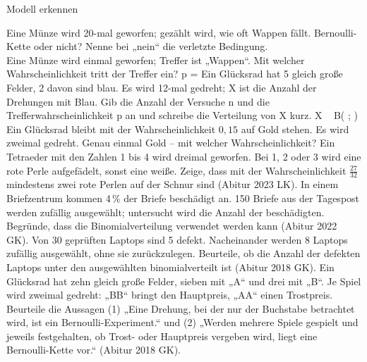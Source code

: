 \setcounter{aufgabe}{10}

\begin{aufgabe}{Modell erkennen}
\begin{teile}
\teil Eine Münze wird 20-mal geworfen; gezählt wird, wie oft Wappen fällt. Bernoulli-Kette oder nicht? Nenne bei „nein“ die verletzte Bedingung.  \\ 
\teil Eine Münze wird einmal geworfen; Treffer ist „Wappen“. Mit welcher Wahrscheinlichkeit tritt der Treffer ein? p = \leerfeld
\teil Ein Glücksrad hat 5 gleich große Felder, 2 davon sind blau. Es wird 12-mal gedreht; X ist die Anzahl der Drehungen mit Blau. Gib die Anzahl der Versuche n und die Trefferwahrscheinlichkeit p an und schreibe die Verteilung von X kurz. X ~ B( \leerfeld ; \leerfeld )
\teil Ein Glücksrad bleibt mit der Wahrscheinlichkeit $0{,}15$ auf Gold stehen. Es wird zweimal gedreht. Genau einmal Gold – mit welcher Wahrscheinlichkeit? \leerfeld
\teil Ein Tetraeder mit den Zahlen 1 bis 4 wird dreimal geworfen. Bei 1, 2 oder 3 wird eine rote Perle aufgefädelt, sonst eine weiße. Zeige, dass mit der Wahrscheinlichkeit $\frac{27}{32}$ mindestens zwei rote Perlen auf der Schnur sind \hfill (Abitur 2023 LK).
\teil In einem Briefzentrum kommen 4\,\% der Briefe beschädigt an. 150 Briefe aus der Tagespost werden zufällig ausgewählt; untersucht wird die Anzahl der beschädigten. Begründe, dass die Binomialverteilung verwendet werden kann \hfill (Abitur 2022 GK).
\teil Von 30 geprüften Laptops sind 5 defekt. Nacheinander werden 8 Laptops zufällig ausgewählt, ohne sie zurückzulegen. Beurteile, ob die Anzahl der defekten Laptops unter den ausgewählten binomialverteilt ist \hfill (Abitur 2018 GK).
\teil Ein Glücksrad hat zehn gleich große Felder, sieben mit „A“ und drei mit „B“. Je Spiel wird zweimal gedreht: „BB“ bringt den Hauptpreis, „AA“ einen Trostpreis. Beurteile die Aussagen (1) „Eine Drehung, bei der nur der Buchstabe betrachtet wird, ist ein Bernoulli-Experiment.“ und (2) „Werden mehrere Spiele gespielt und jeweils festgehalten, ob Trost- oder Hauptpreis vergeben wird, liegt eine Bernoulli-Kette vor.“ \hfill (Abitur 2018 GK).
\end{teile}
\end{aufgabe}

